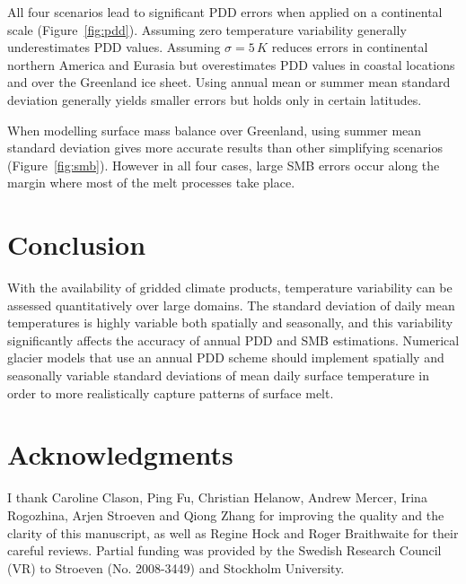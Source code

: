 \documentclass[review]{igs}
\begin{document}
All four scenarios lead to significant PDD errors when applied on a continental scale (Figure~\ref{fig:pdd}). Assuming zero temperature variability generally underestimates PDD values. Assuming $\sigma=5\,K$ reduces errors in continental northern America and Eurasia but overestimates PDD values in coastal locations and over the Greenland ice sheet. Using annual mean or summer mean standard deviation generally yields smaller errors but holds only in certain latitudes.

When modelling surface mass balance over Greenland, using summer mean standard deviation gives more accurate results than other simplifying scenarios (Figure~\ref{fig:smb}). However in all four cases, large SMB errors occur along the margin where most of the melt processes take place.


\section{Conclusion}

With the availability of gridded climate products, temperature variability can be assessed quantitatively over large domains. The standard deviation of daily mean temperatures is highly variable both spatially and seasonally, and this variability significantly affects the accuracy of annual PDD and SMB estimations. Numerical glacier models that use an annual PDD scheme should implement spatially and seasonally variable standard deviations of mean daily surface temperature in order to more realistically capture patterns of surface melt.


\section{Acknowledgments}

I thank Caroline Clason, Ping Fu, Christian Helanow, Andrew Mercer, Irina Rogozhina, Arjen Stroeven and Qiong Zhang for improving the quality and the clarity of this manuscript, as well as Regine Hock and Roger Braithwaite for their careful reviews. Partial funding was provided by the Swedish Research Council (VR) to Stroeven (No. 2008-3449) and Stockholm University.



\end{document}
